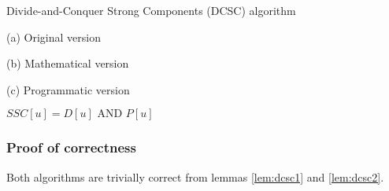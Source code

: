 \documentclass{report}[a4paper]
\theoremstyle{remark}
\begin{document}
\begin{center}
    \begin{algorithm}[H]
        \caption{Divide-and-Conquer Strong Components (DCSC) algorithm}
        \label{alg-dcsc}
        \begin{minipage}[t]{0.49\linewidth}
            (a) Original version
            \begin{algorithmic}[1]
                     
                     
                     
                    \State {}
                \EndFunction
            \end{algorithmic}
        \end{minipage}
        \begin{minipage}[t]{0.49\linewidth}
            (b) Mathematical version
            \begin{algorithmic}[1]
                     
                     
                    \State {}
                \EndFunction
            \end{algorithmic}
            (c) Programmatic version
            \begin{algorithmic}[1]
                     
                     
                     {$SSC[u] = D[u] \text{ AND } P[u]$}
                    \EndFor
                    \State {}
                \EndFunction
            \end{algorithmic}
        \end{minipage}
    \end{algorithm}
\end{center}
\subsubsection{Proof of correctness}
Both algorithms are trivially correct from lemmas \ref{lem:dcsc1} and \ref{lem:dcsc2}.
\end{document}
